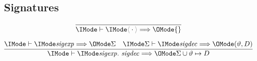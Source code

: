 \documentclass{report}
\begin{document}
\subsection*{Signatures\hfill \framebox{$\Elab{}{\SortSigExpr}{\Sigma}$}}

\begin{gather}
  \infer{
    \Elab{}{\EmptySig}{\{\}}
  }{
  }\\[6pt]
  \infer{
    \Elab{}{\ExtendSig{\SortSigExpr}{\SortSigDecl}}{\Sigma\cup\vartheta\mapsto D}
  }{
    \Elab{}{\SortSigExpr}{\Sigma} &
    \Elab{\Sigma}{\SortSigDecl}{(\vartheta, D)}
  }
\end{gather}
\end{document}
